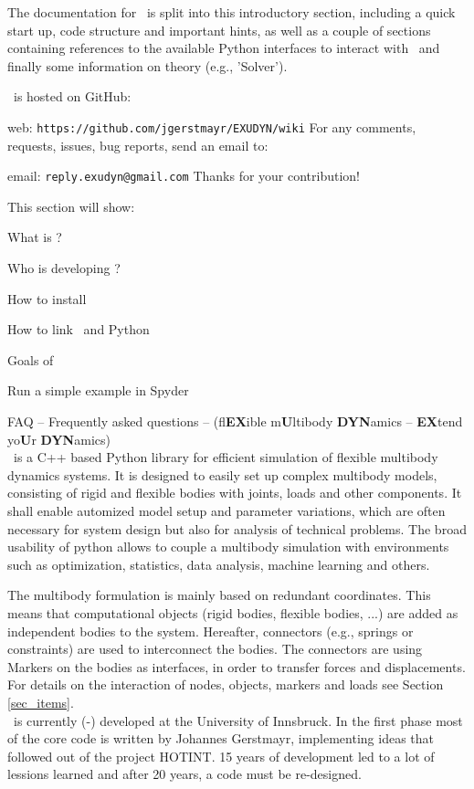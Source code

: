 
The documentation for \codeName\ is split into this introductory section, including a quick start up, code structure and important hints, 
as well as a couple of sections containing references to the available Python interfaces to interact with \codeName\ and finally some information on theory (e.g., 'Solver').

\codeName\ is hosted on GitHub:
\bi
 \item web: \texttt{https://github.com/jgerstmayr/EXUDYN/wiki}
\ei
For any comments, requests, issues, bug reports, send an email to: 
\bi
  \item email: \texttt{reply.exudyn@gmail.com}
\ei
Thanks for your contribution!

This section will show:
\bn
	\item What is \codeName ?
	\item Who is developing \codeName ?
	\item How to install \codeName\ 
	\item How to link \codeName\ and Python
	\item Goals of \codeName
	\item Run a simple example in Spyder
	\item FAQ -- Frequently asked questions
\en
%
\codeName -- {\small (fl{\bf EX}ible m{\bf U}ltibody {\bf DYN}amics  -- {\bf EX}tend yo{\bf U}r {\bf DYN}amics)}\vspace{6pt}\\
\noindent \codeName\ is a C++ based Python library for efficient simulation of flexible multibody dynamics systems.
It is designed to easily set up complex multibody models, consisting of rigid and flexible bodies with joints, loads and other components. It shall enable automized model setup and parameter variations, which are often necessary for system design but also for analysis of technical problems. The broad usability of python allows to couple a multibody simulation with environments such as optimization, statistics, data analysis, machine learning and others.

The multibody formulation is mainly based on redundant coordinates. This means that computational objects (rigid bodies, flexible bodies, ...) are added as independent bodies to the system. Hereafter, connectors (e.g., springs or constraints) are used to interconnect the bodies. The connectors are using Markers on the bodies as interfaces, in order to transfer forces and displacements.
For details on the interaction of nodes, objects, markers and loads see Section \ref{sec_items}.
\vspace{6pt}\\
%
\codeName\ is currently (\the\month-\the\year) developed at the University of Innsbruck.
In the first phase most of the core code is written by Johannes Gerstmayr, implementing ideas that followed out of the project HOTINT. 15 years of development led to a lot of lessions learned and after 20 years, a code must be re-designed.

